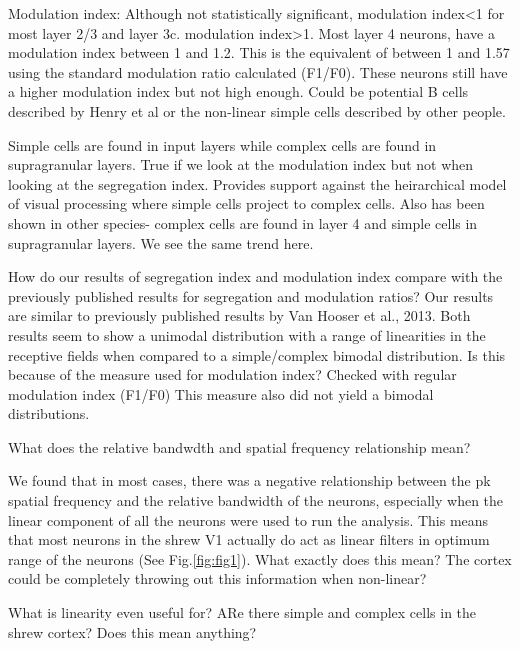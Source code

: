 		Modulation index: Although not statistically significant, modulation index<1 for most layer 2/3 and layer 3c. modulation index>1. Most layer 4 neurons, have a modulation index between 1 and 1.2. This is the equivalent of between 1 and 1.57 using the standard modulation ratio calculated (F1/F0). These neurons still have a higher modulation index but not high enough. Could be potential B cells described by Henry et al or the non-linear simple cells described by other people. 
		
		Simple cells are found in input layers while complex cells are found in supragranular layers. True if we look at the modulation index but not when looking at the segregation index. Provides support against the heirarchical model of visual processing where simple cells project to complex cells. Also has been shown in other species- complex cells are found in layer 4 and simple cells in supragranular layers. We see the same trend here.
		
		How do our results of segregation index and modulation index compare with the previously published results for segregation and modulation ratios?  Our results are similar to previously published results by Van Hooser et al., 2013. Both results seem to show a unimodal distribution with a range of linearities in the receptive fields when compared to a simple/complex bimodal distribution. Is this because of the measure used for modulation index? Checked with regular modulation index (F1/F0) This measure also did not yield a bimodal distributions.
		
		What does the relative bandwdth and spatial frequency relationship mean?
		
		We found that in most cases, there was a negative relationship between the pk spatial frequency and the relative bandwidth of the neurons, especially when the linear component of all the neurons were used to run the analysis. This means that most neurons in the shrew V1 actually do act as linear filters in optimum range of the neurons (See Fig.\ref{fig:fig1}).
		What exactly does this mean? The cortex could be completely throwing out this information when non-linear?
		
		What is linearity even useful for?
		ARe there simple and complex cells in the shrew cortex? Does this mean anything?